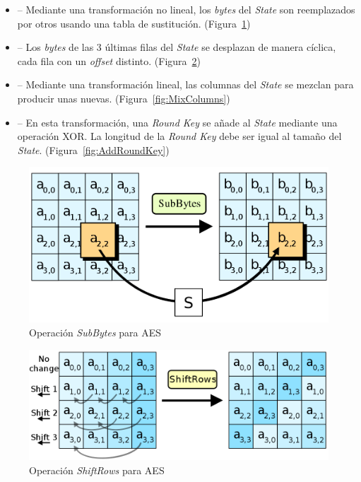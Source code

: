 \begin{itemize}
  \item {} -- Mediante una transformación no lineal, los \emph{bytes} del \emph{State} son reemplazados por otros usando una tabla de sustitución. (Figura~\ref{fig:SubBytes})

  \item {} -- Los \emph{bytes} de las 3 últimas filas del \emph{State} se desplazan de manera cíclica, cada fila con un \emph{offset} distinto. (Figura~\ref{fig:ShiftRows})

  \item {} -- Mediante una transformación lineal, las columnas del \emph{State} se mezclan para producir unas nuevas. (Figura~\ref{fig:MixColumns})

  \item {} -- En esta transformación, una \emph{Round Key} se añade al \emph{State} mediante una operación XOR. La longitud de la \emph{Round Key} debe ser igual al tamaño del \emph{State}. (Figura~\ref{fig:AddRoundKey})
\end{itemize}

\begin{figure}[ht]
  \centering
  \includegraphics[scale=0.25]{Figures/SubBytes}
  \decoRule
  \caption[\emph{SubBytes} (AES)]{Operación \emph{SubBytes} para AES \emph{\parencite{Reference27}}}
  \label{fig:SubBytes}
\end{figure}

\begin{figure}[ht]
  \centering
  \includegraphics[scale=0.4]{Figures/ShiftRows}
  \decoRule
  \caption[\emph{ShiftRows} (AES)]{Operación \emph{ShiftRows} para AES \emph{\parencite{Reference28}}}
  \label{fig:ShiftRows}
\end{figure}

